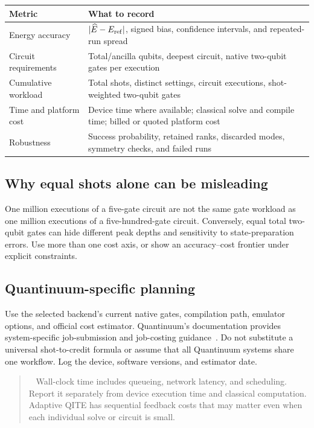 \documentclass[11pt,a4paper]{article}
\newenvironment{caution}[1][Important distinction]{\par\smallskip\begin{quotation}\noindent{\bfseries\textcolor{alertred}{#1.}}\ }{\end{quotation}\smallskip}
\begin{document}
\begin{tabularx}{\linewidth}{@{}p{3.5cm}X@{}}
\toprule
Metric & What to record\\\midrule
Energy accuracy & $|\widehat E-E_{\rm ref}|$, signed bias, confidence intervals, and repeated-run spread\\
Circuit requirements & Total/ancilla qubits, deepest circuit, native two-qubit gates per execution\\
Cumulative workload & Total shots, distinct settings, circuit executions, shot-weighted two-qubit gates\\
Time and platform cost & Device time where available; classical solve and compile time; billed or quoted platform cost\\
Robustness & Success probability, retained ranks, discarded modes, symmetry checks, and failed runs\\\bottomrule
\end{tabularx}

\subsection*{Why equal shots alone can be misleading}
One million executions of a five-gate circuit are not the same gate workload as one million executions of a five-hundred-gate circuit. Conversely, equal total two-qubit gates can hide different peak depths and sensitivity to state-preparation errors. Use more than one cost axis, or show an accuracy--cost frontier under explicit constraints.

\subsection*{Quantinuum-specific planning}
Use the selected backend's current native gates, compilation path, emulator options, and official cost estimator. Quantinuum's documentation provides system-specific job-submission and job-costing guidance~\cite{quantinuum,quantcost}. Do not substitute a universal shot-to-credit formula or assume that all Quantinuum systems share one workflow. Log the device, software versions, and estimator date.

\begin{caution}[Separate scientific time from waiting time]
Wall-clock time includes queueing, network latency, and scheduling. Report it separately from device execution time and classical computation. Adaptive QITE has sequential feedback costs that may matter even when each individual solve or circuit is small.
\end{caution}
\end{document}

